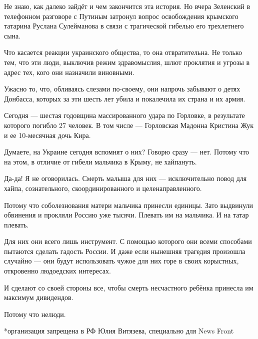 Не знаю, как далеко зайдёт и чем закончится эта история.  Но вчера Зеленский в
телефонном разговоре с Путиным затронул вопрос освобождения крымского татарина
Руслана Сулейманова в связи с трагической гибелью его трехлетнего сына.

Что касается реакции украинского общества, то она отвратительна. Не только тем,
что эти люди, выключив режим здравомыслия, шлют проклятия и угрозы в адрес тех,
кого они назначили виновными.

Ужасно то, что, обливаясь слезами по-своему, они напрочь забывают о детях
Донбасса, которых за эти шесть лет убила и покалечила их страна и их армия.

Сегодня — шестая годовщина массированного удара по Горловке, в результате
которого погибло 27 человек.  В том числе — Горловская Мадонна Кристина Жук и
ее 10-месячная дочь Кира.

Думаете, на Украине сегодня вспомнят о них?  Говорю сразу — нет.  Потому что на
этом, в отличие от гибели мальчика в Крыму, не хайпануть.

Да-да! Я не оговорилась.  Смерть малыша для них — исключительно повод для
хайпа, сознательного, скоординированного и целенаправленного.

Потому что соболезнования матери мальчика принесли единицы. Зато выдвинули
обвинения и прокляли Россию уже тысячи.  Плевать им на мальчика.  И на татар
плевать.

Для них они всего лишь инструмент.  С помощью которого они всеми способами
пытаются сделать гадость России.  И даже если нынешняя трагедия произошла
случайно --- они будут использовать чужое для них горе в своих корыстных,
откровенно людоедских интересах.

И сделают со своей стороны все, чтобы смерть несчастного ребёнка принесла им
максимум дивидендов.

Потому что нелюди.

*организация запрещена в РФ Юлия Витязева, специально для News Front
  
